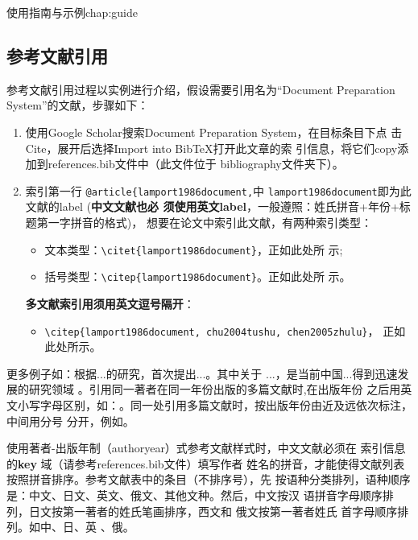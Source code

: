 \begin{cuzchapter}{使用指南与示例}{chap:guide}
    \subsection{参考文献引用}\label{sub:references}

    参考文献引用过程以实例进行介绍，假设需要引用名为``Document Preparation
    System''的文献，步骤如下：
    \begin{enumerate}
        \item 使用Google Scholar搜索Document Preparation System，在目标条目下点
              击Cite，展开后选择Import into BibTeX打开此文章的索
              引信息，将它们copy添加到references.bib文件中（此文件位于
              bibliography文件夹下）。
        \item 索引第一行 \verb|@article{lamport1986document,|中
              \verb|lamport1986document|即为此文献的label (\textbf{中文文献也必
                  须使用英文label}，一般遵照：姓氏拼音+年份+标题第一字拼音的格式)，
              想要在论文中索引此文献，有两种索引类型：
              \begin{itemize}
                  \item 文本类型：\verb|\citet{lamport1986document}|，正如此处所
                        示\citet{lamport1986document};
                  \item 括号类型：\verb|\citep{lamport1986document}|。正如此处所
                        示\citep{lamport1986document}。
              \end{itemize}
              \textbf{多文献索引用须用英文逗号隔开}：
              \begin{itemize}
                  \item \verb|\citep{lamport1986document, chu2004tushu, chen2005zhulu}|，
                        正如此处所示\citep{lamport1986document, chu2004tushu, chen2005zhulu}。
              \end{itemize}
    \end{enumerate}

    更多例子如：\citet{walls2013drought}根据...的研究，首次提出...。其中关于
    ...\citep{walls2013drought}，是当前中国...得到迅速发展的研究领域
    \citep{chen1980zhongguo}。引用同一著者在同一年份出版的多篇文献时,在出版年份
    之后用英文小写字母区别，如：\citep{yuan2012lana, yuan2012lanb,
        yuan2012lanc}。同一处引用多篇文献时，按出版年份由近及远依次标注，中间用分号
    分开，例如\citep{chen1980zhongguo, stamerjohanns2009mathml, hls2012jinji,
        niu2013zonghe}。

    使用著者-出版年制（authoryear）式参考文献样式时，中文文献必须在
    索引信息的\textbf{key} 域（请参考references.bib文件）填写作者
    姓名的拼音，才能使得文献列表按照拼音排序。参考文献表中的条目（不排序号），先
    按语种分类排列，语种顺序是：中文、日文、英文、俄文、其他文种。然后，中文按汉
    语拼音字母顺序排列，日文按第一著者的姓氏笔画排序，西文和 俄文按第一著者姓氏
    首字母顺序排列。如中\citep{niu2013zonghe}、日\citep{Bohan1928}、英
    \citep{stamerjohanns2009mathml}、俄\citep{Dubrovin1906}。


\end{cuzchapter}
